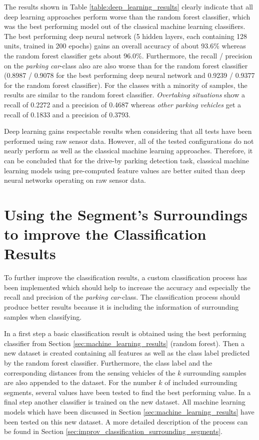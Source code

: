 The results shown in Table \ref{table:deep_learning_results} clearly indicate that all deep learning approaches perform worse than the random forest classifier, which was the best performing model out of the classical machine learning classifiers. The best performing deep neural network (5 hidden layers, each containing 128 units, trained in 200 epochs) gains an overall accuracy of about 93.6\% whereas the random forest classifier gets about 96.0\%. Furthermore, the recall / precision on the \emph{parking car}-class also are also worse than for the random forest classifier (0.8987 / 0.9078 for the best performing deep neural network and 0.9239 / 0.9377 for the random forest classifier). For the classes with a minority of samples, the results are similar to the random forest classifier. \emph{Overtaking situations} show a recall of 0.2272 and a precision of 0.4687 whereas \emph{other parking vehicles} get a recall of 0.1833 and a precision of 0.3793.

Deep learning gains respectable results when considering that all tests have been performed using raw sensor data. However, all of the tested configurations do not nearly perform as well as the classical machine learning approaches. Therefore, it can be concluded that for the drive-by parking detection task, classical machine learning models using pre-computed feature values are better suited than deep neural networks operating on raw sensor data.



\section{Using the Segment's Surroundings to improve the Classification Results}
\label{sec:using_surroundings_to_improve_results}

To further improve the classification results, a custom classification process has been implemented which should help to increase the accuracy and especially the recall and precision of the \emph{parking car}-class. The classification process should produce better results because it is including the information of surrounding samples when classifying.

In a first step a basic classification result is obtained using the best performing classifier from Section \ref{sec:machine_learning_results} (random forest). 
 Then a new dataset is created containing all features as well as the class label predicted by the random forest classifier. Furthermore, the class label and the corresponding distances from the sensing vehicles of the $k$ surrounding samples are also appended to the dataset. For the number $k$ of included surrounding segments, several values have been tested to find the best performing value. In a final step another classifier is trained on the new dataset. All machine learning models which have been discussed in Section \ref{sec:machine_learning_results} have been tested on this new dataset. A more detailed description of the process can be found in Section \ref{sec:improv_classification_surrounding_segments}.
 
